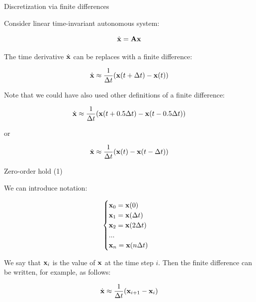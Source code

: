 \documentclass{beamer}
\begin{document}
\begin{frame}{Discretization via finite differences}
\begin{flushleft}

Consider linear time-invariant autonomous system:

\begin{equation}
    \dot {\mathbf{x}} = \mathbf{A} \mathbf{x}
\end{equation}


The time derivative $\dot {\mathbf{x}}$ can be replaces with a finite difference:

\begin{equation}
\dot {\mathbf{x}} \approx \frac{1}{\Delta t}(\mathbf{x}(t + \Delta t) - \mathbf{x}(t))
\end{equation}

Note that we could have also used other definitions of a finite difference:

\begin{equation}
\dot {\mathbf{x}} \approx \frac{1}{\Delta t}(\mathbf{x}(t + 0.5\Delta t) - \mathbf{x}(t - 0.5\Delta t))
\end{equation}

or

\begin{equation}
\dot {\mathbf{x}} \approx \frac{1}{\Delta t}(\mathbf{x}(t) - \mathbf{x}(t - \Delta t))
\end{equation}

\end{flushleft}
\end{frame}




\begin{frame}{Zero-order hold (1)}
\begin{flushleft}
We can introduce notation:

\begin{equation}
\begin{cases}
\mathbf{x}_0 = \mathbf{x}(0) \\
\mathbf{x}_1 = \mathbf{x}(\Delta t) \\
\mathbf{x}_2 = \mathbf{x}(2\Delta t) \\
... \\
\mathbf{x}_n = \mathbf{x}(n\Delta t) 
\end{cases}
\end{equation}

We say that $\mathbf{x}_i$ is the value of $\mathbf{x}$ at the time step $i$. Then the finite difference can be written, for example, as follows:

\begin{equation}
\dot {\mathbf{x}} \approx \frac{1}{\Delta t}(\mathbf{x}_{i+1} - \mathbf{x}_i)
\end{equation}

\end{flushleft}
\end{frame}
\end{document}
